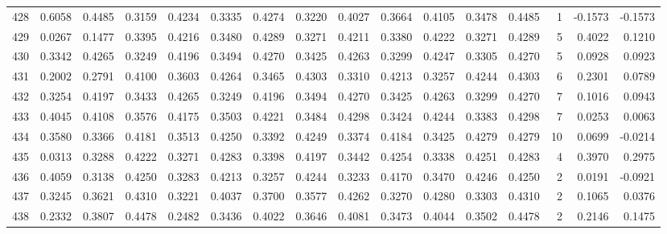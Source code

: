\begin{tabular}{lrrrrrrrrrrrrrrr}
428 &      0.6058 &  0.4485 &  0.3159 &  0.4234 &  0.3335 &  0.4274 &  0.3220 &  0.4027 &  0.3664 &  0.4105 &   0.3478 &     0.4485 &      1 &                   -0.1573 &                    -0.1573 \\
429 &      0.0267 &  0.1477 &  0.3395 &  0.4216 &  0.3480 &  0.4289 &  0.3271 &  0.4211 &  0.3380 &  0.4222 &   0.3271 &     0.4289 &      5 &                    0.4022 &                     0.1210 \\
430 &      0.3342 &  0.4265 &  0.3249 &  0.4196 &  0.3494 &  0.4270 &  0.3425 &  0.4263 &  0.3299 &  0.4247 &   0.3305 &     0.4270 &      5 &                    0.0928 &                     0.0923 \\
431 &      0.2002 &  0.2791 &  0.4100 &  0.3603 &  0.4264 &  0.3465 &  0.4303 &  0.3310 &  0.4213 &  0.3257 &   0.4244 &     0.4303 &      6 &                    0.2301 &                     0.0789 \\
432 &      0.3254 &  0.4197 &  0.3433 &  0.4265 &  0.3249 &  0.4196 &  0.3494 &  0.4270 &  0.3425 &  0.4263 &   0.3299 &     0.4270 &      7 &                    0.1016 &                     0.0943 \\
433 &      0.4045 &  0.4108 &  0.3576 &  0.4175 &  0.3503 &  0.4221 &  0.3484 &  0.4298 &  0.3424 &  0.4244 &   0.3383 &     0.4298 &      7 &                    0.0253 &                     0.0063 \\
434 &      0.3580 &  0.3366 &  0.4181 &  0.3513 &  0.4250 &  0.3392 &  0.4249 &  0.3374 &  0.4184 &  0.3425 &   0.4279 &     0.4279 &     10 &                    0.0699 &                    -0.0214 \\
435 &      0.0313 &  0.3288 &  0.4222 &  0.3271 &  0.4283 &  0.3398 &  0.4197 &  0.3442 &  0.4254 &  0.3338 &   0.4251 &     0.4283 &      4 &                    0.3970 &                     0.2975 \\
436 &      0.4059 &  0.3138 &  0.4250 &  0.3283 &  0.4213 &  0.3257 &  0.4244 &  0.3233 &  0.4170 &  0.3470 &   0.4246 &     0.4250 &      2 &                    0.0191 &                    -0.0921 \\
437 &      0.3245 &  0.3621 &  0.4310 &  0.3221 &  0.4037 &  0.3700 &  0.3577 &  0.4262 &  0.3270 &  0.4280 &   0.3303 &     0.4310 &      2 &                    0.1065 &                     0.0376 \\
438 &      0.2332 &  0.3807 &  0.4478 &  0.2482 &  0.3436 &  0.4022 &  0.3646 &  0.4081 &  0.3473 &  0.4044 &   0.3502 &     0.4478 &      2 &                    0.2146 &                     0.1475 \\

\end{tabular}
